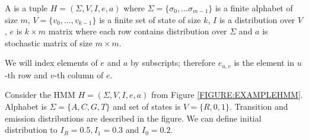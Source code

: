 \begin{definition}\label{DEF:HMM}
A  is a tuple $H=(\Sigma,V,I,e,a)$ where
$\Sigma=\{\sigma_0,\dots\sigma_{m-1}\}$ is a finite alphabet of size $m$,
$V=\{v_0,\dots,v_{k-1}\}$ is a finite set of state of size $k$, $I$ is
a distribution over $V$, $e$ is $k\times m$ matrix where each row contains
distribution over $\Sigma$ and $a$ is stochastic matrix of size $m\times m$.

We will index elements of $e$ and $a$ by subscripts; therefore $e_{u,v}$ is
the element in $u$-th row and $v$-th column of $e$.  

\end{definition}

\begin{example}\label{EXAMPLE:EXAMPLEHMM} Consider the HMM $H=(\Sigma,V,I,e,a)$ from Figure
\ref{FIGURE:EXAMPLEHMM}.  Alphabet is $\Sigma=\{A,C,G,T\}$ and set of states is
$V=\{R,0,1\}$.  Transition and emission distributions are described in the figure.
We can define initial distribution to $I_R=0.5, I_1=0.3$ and $I_{0}=0.2$.
\end{example}


